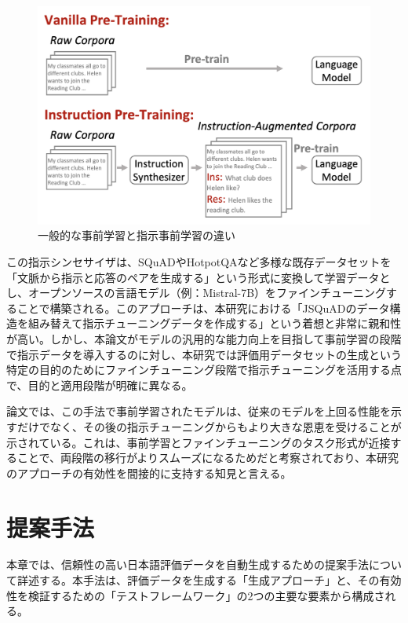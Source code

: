 \documentclass[a4paper,11pt]{jreport}
\begin{document}
\begin{figure}[t]
  \centering
  \includegraphics[width=0.9\linewidth]{./fig/instruction-pretraining_fig1.png}
  \caption{一般的な事前学習と指示事前学習の違い\cite{Instruction Pre-Training}}
  \label{fig:instruction_pretraining_example}
\end{figure}

この指示シンセサイザは、SQuADやHotpotQAなど多様な既存データセットを「文脈から指示と応答のペアを生成する」という形式に変換して学習データとし、オープンソースの言語モデル（例：Mistral-7B）をファインチューニングすることで構築される\cite{Instruction Pre-Training}。このアプローチは、本研究における「JSQuADのデータ構造を組み替えて指示チューニングデータを作成する」という着想と非常に親和性が高い。しかし、本論文がモデルの汎用的な能力向上を目指して事前学習の段階で指示データを導入するのに対し、本研究では評価用データセットの生成という特定の目的のためにファインチューニング段階で指示チューニングを活用する点で、目的と適用段階が明確に異なる。

論文では、この手法で事前学習されたモデルは、従来のモデルを上回る性能を示すだけでなく、その後の指示チューニングからもより大きな恩恵を受けることが示されている\cite{Instruction Pre-Training}。これは、事前学習とファインチューニングのタスク形式が近接することで、両段階の移行がよりスムーズになるためだと考察されており、本研究のアプローチの有効性を間接的に支持する知見と言える。








\chapter{提案手法}
\label{chap:proposal}
本章では、信頼性の高い日本語評価データを自動生成するための提案手法について詳述する。本手法は、評価データを生成する「生成アプローチ」と、その有効性を検証するための「テストフレームワーク」の2つの主要な要素から構成される。
\end{document}
